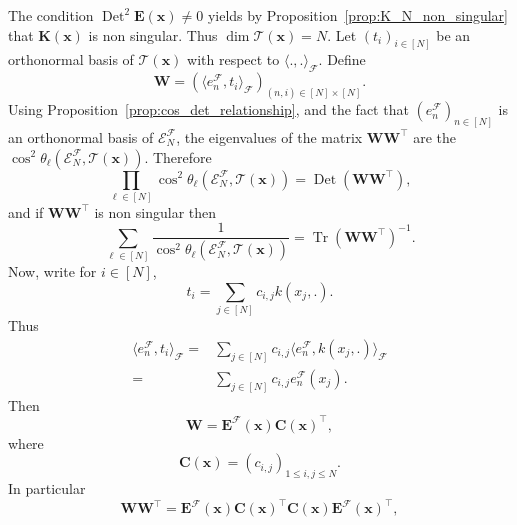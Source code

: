 \documentclass[twoside,11pt]{book}
\numberwithin{theorem}{chapter}
\numberwithin{definition}{chapter}
\numberwithin{proposition}{chapter}
\numberwithin{corollary}{chapter}
\numberwithin{example}{chapter}
\numberwithin{lemma}{chapter}
\numberwithin{assumption}{chapter}
\numberwithin{equation}{chapter}
\numberwithin{figure}{chapter}
\DeclareMathOperator{\Tr}{Tr}
\DeclareMathOperator{\Det}{Det}
\DeclareMathOperator{\Tran}{\intercal}
\begin{document}
The condition $\Det^{2} \bm{E}(\bm{x}) \neq 0$ yields by Proposition~\ref{prop:K_N_non_singular} that $\bm{K}(\bm{x})$ is non singular. Thus $\dim \mathcal{T}(\bm{x}) = N$. Let $(t_{i})_{i \in [N]}$ be an orthonormal basis of $\mathcal{T}(\bm{x})$ with respect to $\langle ., . \rangle_{\mathcal{F}}$.
%
Define 
\begin{equation}
\bm{W} = (\langle e_{n}^{\mathcal{F}}, t_{i} \rangle_{\mathcal{F}})_{(n,i) \in [N]\times[N]}.
\end{equation}
Using Proposition~\ref{prop:cos_det_relationship}, and the fact that $(e_{n}^{\mathcal{F}})_{n \in [N]}$ is an orthonormal basis of $\mathcal{E}^{\mathcal{F}}_{N}$, the eigenvalues of the matrix $\bm{W} \bm{W}^{\Tran}$ are the $\cos^{2} \theta_{\ell} \left(\mathcal{E}^{\mathcal{F}}_{N}, \mathcal{T}(\bm{x}) \right)$.
Therefore
\begin{equation}\label{eq:prod_cos_det_E}
\prod\limits_{\ell \in [N]} \cos^{2} \theta_{\ell} \left(\mathcal{E}^{\mathcal{F}}_{N}, \mathcal{T}(\bm{x}) \right) = \Det (\bm{W}\bm{W}^{\Tran}),
\end{equation}
and if $\bm{W}\bm{W}^{\Tran}$ is non singular then 
\begin{equation}
\sum\limits_{\ell \in [N]} \frac{1}{\cos^{2} \theta_{\ell} \left(\mathcal{E}^{\mathcal{F}}_{N}, \mathcal{T}(\bm{x}) \right)} = \Tr (\bm{W}\bm{W}^{\Tran})^{-1}.
\end{equation}
Now, write for $i \in [N]$,
\begin{equation}\label{eq:t_as_function_of_kx}
t_{i} = \sum\limits_{j \in [N]} c_{i,j} k(x_{j},.).
\end{equation}
%
Thus
\begin{align}
\langle e_{n}^{\mathcal{F}}, t_{i} \rangle_{\mathcal{F}} = & \sum\limits_{j \in [N]} c_{i,j} \langle e_{n}^{\mathcal{F}}, k(x_{j},.) \rangle_{\mathcal{F}} \\
= &\sum\limits_{j \in [N]} c_{i,j}  e_{n}^{\mathcal{F}}(x_{j}).
\end{align}
%
Then
\begin{equation}
\bm{W} = \bm{E}^{\mathcal{F}}(\bm{x}) \bm{C}(\bm{x})^{\Tran} ,
\end{equation}
where
\begin{equation}
\bm{C}(\bm{x}) = (c_{i,j})_{1 \leq i,j \leq N}.
\end{equation}
In particular
\begin{equation}
 \bm{W} \bm{W}^{\Tran} = \bm{E}^{\mathcal{F}}(\bm{x}) \bm{C}(\bm{x}) ^{\Tran} \bm{C}(\bm{x}) \bm{E}^{\mathcal{F}}(\bm{x})^{\Tran} ,
\end{equation}
\end{document}
